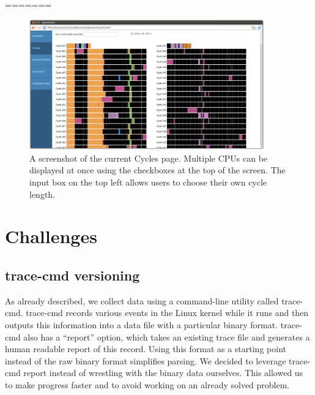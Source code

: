 \documentclass{hmcclinic}
\begin{document}
%
=======
\begin{figure}
\begin{center}
\includegraphics[width=4in]{cycles-page.png}
\caption{A screenshot of the current Cycles page. Multiple CPUs can be displayed
at once using the checkboxes at the top of the screen. The input box on the top
left allows users to choose their own cycle length.}
\end{center}
\end{figure}

\chapter{Challenges}
\section{trace-cmd versioning} %
  As already described, we collect data using a command-line utility called
  trace-cmd. trace-cmd records various events in the Linux kernel while it runs
  and then outputs this information into a data file with a particular binary
  format. trace-cmd also has a ``report'' option, which takes an existing trace
  file and generates a human readable report of this record. Using this format
  as a starting point instead of the raw binary format simplifies parsing.
  We decided to leverage trace-cmd report instead of wrestling with the binary
  data ourselves. This allowed us to make progress faster and to avoid working
  on an already solved problem.
\end{document}
